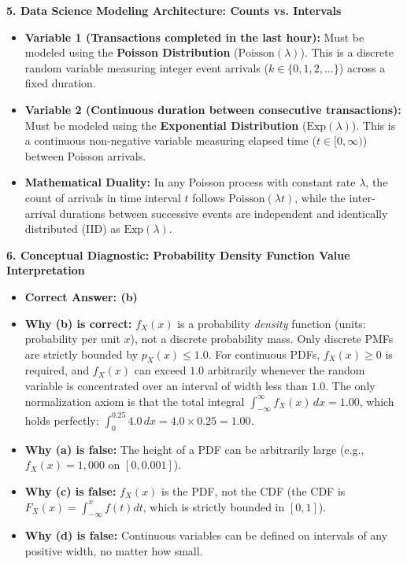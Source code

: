 \textbf{5. Data Science Modeling Architecture: Counts vs. Intervals}
\begin{itemize}
    \item \textbf{Variable 1 (Transactions completed in the last hour):} Must be modeled using the \textbf{Poisson Distribution} ($\text{Poisson}(\lambda)$). This is a discrete random variable measuring integer event arrivals ($k \in \{0, 1, 2, \dots\}$) across a fixed duration.
    \item \textbf{Variable 2 (Continuous duration between consecutive transactions):} Must be modeled using the \textbf{Exponential Distribution} ($\text{Exp}(\lambda)$). This is a continuous non-negative variable measuring elapsed time ($t \in [0, \infty)$) between Poisson arrivals.
    \item \textbf{Mathematical Duality:} In any Poisson process with constant rate $\lambda$, the count of arrivals in time interval $t$ follows $\text{Poisson}(\lambda t)$, while the inter-arrival durations between successive events are independent and identically distributed (IID) as $\text{Exp}(\lambda)$.
\end{itemize}

\textbf{6. Conceptual Diagnostic: Probability Density Function Value Interpretation}
\begin{itemize}
    \item \textbf{Correct Answer: (b)}
    \item \textbf{Why (b) is correct:} $f_X(x)$ is a probability \emph{density} function (units: probability per unit $x$), not a discrete probability mass. Only discrete PMFs are strictly bounded by $p_X(x) \le 1.0$. For continuous PDFs, $f_X(x) \ge 0$ is required, and $f_X(x)$ can exceed $1.0$ arbitrarily whenever the random variable is concentrated over an interval of width less than $1.0$. The only normalization axiom is that the total integral $\int_{-\infty}^\infty f_X(x) \, dx = 1.00$, which holds perfectly: $\int_0^{0.25} 4.0 \, dx = 4.0 \times 0.25 = 1.00$.
    \item \textbf{Why (a) is false:} The height of a PDF can be arbitrarily large (e.g., $f_X(x) = 1{,}000$ on $[0, 0.001]$).
    \item \textbf{Why (c) is false:} $f_X(x)$ is the PDF, not the CDF (the CDF is $F_X(x) = \int_{-\infty}^x f(t) dt$, which is strictly bounded in $[0, 1]$).
    \item \textbf{Why (d) is false:} Continuous variables can be defined on intervals of any positive width, no matter how small.
\end{itemize}

